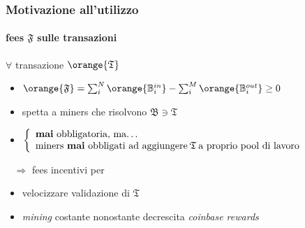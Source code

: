\begin{frame}
	\frametitle{Motivazione all'utilizzo}
		\framesubtitle{fees $\mathfrak{F}$ sulle transazioni}
		
		$\forall$ transazione $\orange{\mathfrak{T}}$
		\begin{itemize}
			\item $\orange{\mathfrak{F}} = \sum_i^N \orange{\mathbb{B}_i^{in}} - \sum_i^M \orange{\mathbb{B}_i^{out}} \geq 0$
			\item spetta a miners che risolvono $\mathfrak{B}\ni\mathfrak{T}$
			\item $ \left \{
					  \begin{array}{lcr}
					    \text{\textbf{mai} obbligatoria, ma\ldots}\\ %
					    \text{miners \textbf{mai} obbligati ad aggiungere}\:\mathfrak{T}\:\text{a proprio pool di lavoro}  %
					  \end{array}
					\right. $  
		\end{itemize}
		\vspace{5pt}
		$  \;\;\; \Rightarrow$ fees {\color{blue}incentivi} per
		\begin{itemize}
			\item velocizzare validazione di $\mathfrak{T}$
			\item \textit{mining} costante nonostante decrescita \textit{coinbase rewards}
		\end{itemize}

\end{frame}